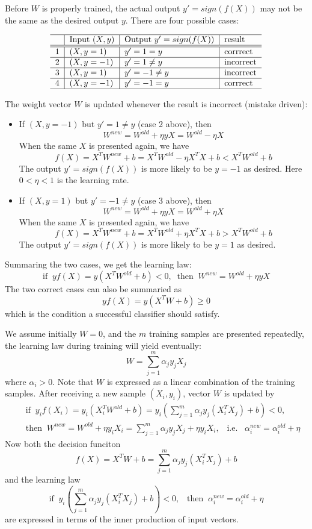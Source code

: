 Before $W$ is properly trained, the actual output $y'=sign(f(X))$ may not be 
the same as the desired output $y$. There are four possible cases:

\[ \begin{tabular}{c|l|l|l} \hline
& Input $(X,y)$ & Output $y'=sign(f(X))$ & result	\\ \hline \hline
1 & $(X,y= 1)$ & $y'= 1=  y $ & corrrect  \\ \hline
2 & $(X,y=-1)$ & $y'= 1\ne y$ & incorrect \\ \hline
3 & $(X,y= 1)$ & $y'=-1\ne y$ & incorrect \\ \hline
4 & $(X,y=-1)$ & $y'=-1=  y $ & corrrect  \\ \hline
\end{tabular} \]

The weight vector $W$ is updated whenever the result is incorrect (mistake
driven):

\begin{itemize} 
\item If $(X,y=-1)$ but $y'=1\ne y$ (case 2 above), then
	\[ W^{new}=W^{old}+\eta y X=W^{old}-\eta X	\]
	When the same $X$ is presented again, we have
	\[ f(X)=X^TW^{new}+b=X^TW^{old}-\eta X^TX+b<X^TW^{old}+b \]
	The output $y'=sign(f(X))$ is more likely to be $y=-1$ as desired. 
	Here $0 < \eta < 1$ is the learning rate.
\item If $(X,y=1)$ but $y'=-1\ne y$ (case 3 above), then
	\[ W^{new}=W^{old}+\eta y X=W^{old}+\eta X	\]
	When the same $X$ is presented again, we have
	\[ f(X)=X^TW^{new}+b=X^TW^{old}+\eta X^TX+b>X^TW^{old}+b \]
	The output $y'=sign(f(X))$ is more likely to be $y=1$ as desired.
\end{itemize}
Summaring the two cases, we get the learning law:
\[	\mbox{if} \;\;y f(X)= y (X^TW^{old}+b)<0,\;\;\mbox{then}\;\;
	 W^{new}=W^{old}+\eta y X	\]
The two correct cases can also be summaried as
\[	y f(X)= y (X^T W+b)\ge 0	\]
which is the condition a successful classifier should satisfy.

We assume initially $W=0$, and the $m$ training samples are presented
repeatedly, the learning law during training will yield eventually:
\[	W=\sum_{j=1}^m \alpha_j y_j X_j		\]
where $\alpha_i>0$. Note that $W$ is expressed as a linear combination of 
the training samples. After receiving a new sample $(X_i,y_i)$, vector $W$
is updated by 
\begin{eqnarray}
&& \mbox{if} \;\;y_i f(X_i)=y_i (X_i^TW^{old}+b)=y_i(\sum_{j=1}^m \alpha_j y_j(X_i^TX_j)+b)<0,
	\nonumber \\
&& \mbox{then}\;\; W^{new}=W^{old}+\eta y_i X_i=\sum_{j=1}^m \alpha_j y_j X_j
	+\eta y_i X_i,\;\;\;\mbox{i.e.}\;\;\;
	\alpha_i^{new}=\alpha_i^{old}+\eta	\nonumber
\end{eqnarray}
Now both the decision funciton
\[ f(X)=X^T W+b=\sum_{j=1}^m \alpha_j y_j (X_i^T X_j)+b	\]
and the learning law 
\[ \mbox{if} \;\;y_i(\sum_{j=1}^m \alpha_j y_j(X_i^TX_j)+b)<0,\;\;\;
	\mbox{then}\;\; \alpha_i^{new}=\alpha_i^{old}+\eta	\]
are expressed in terms of the inner production of input vectors.


